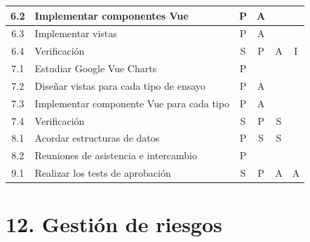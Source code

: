 \documentclass[11pt]{charter}
\begin{document}
\begin{table}[htpb]
{\begin{tabular}{|c|l|c|c|c|c|}
6.2 & Implementar componentes Vue & P & A &  &  \\ \hline
6.3 & Implementar vistas & P & A &  &  \\ \hline
6.4 & Verificación & S & P & A & I \\ \hline
7.1 & Estudiar Google Vue Charts & P &  &  &  \\ \hline
7.2 & Diseñar vistas para cada tipo de ensayo & P & A &  &  \\ \hline
7.3 & Implementar componente Vue para cada tipo & P & A &  &  \\ \hline
7.4 & Verificación & S & P & S &  \\ \hline
8.1 & Acordar estructuras de datos & P & S & S &  \\ \hline
8.2 & Reuniones de asistencia e intercambio & P &  &  &  \\ \hline
9.1 & Realizar los tests de aprobación & S & P & A & A \\ \hline
\end{tabular}%
}
\end{table}


\section{12. Gestión de riesgos}
\label{sec:riesgos}

\end{document}
